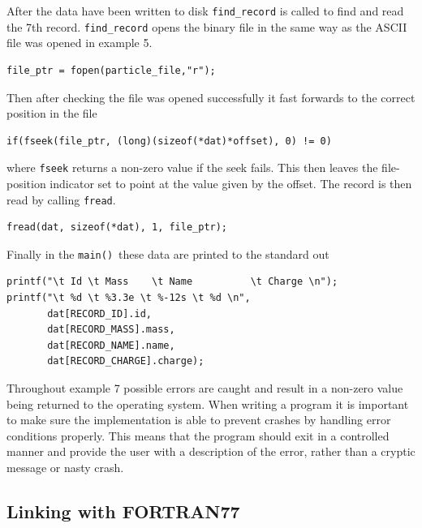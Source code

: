 \documentclass[11pt]{scrartcl}
\def\main{\texttt{main()}}
\begin{document}
After the data have been written to disk \texttt{find\_record} is
called to find and read the 7th record.  \texttt{find\_record} opens
the binary file in the same way as the ASCII file was opened in
example 5.
\begin{lstlisting}
file_ptr = fopen(particle_file,"r"); 
\end{lstlisting}
Then after checking the file was opened successfully it fast forwards to the correct position in the file
\begin{lstlisting}
if(fseek(file_ptr, (long)(sizeof(*dat)*offset), 0) != 0)
\end{lstlisting}
where \texttt{fseek} returns a non-zero value if the seek fails.  This then leaves the file-position indicator set to point at the value given by the offset.  The record is then read by calling \texttt{fread}.
\begin{lstlisting}
fread(dat, sizeof(*dat), 1, file_ptr);
\end{lstlisting}
Finally in the \main\ these data are printed to the standard out
\begin{lstlisting}
printf("\t Id \t Mass    \t Name          \t Charge \n");
printf("\t %d \t %3.3e \t %-12s \t %d \n", 
       dat[RECORD_ID].id,
       dat[RECORD_MASS].mass,
       dat[RECORD_NAME].name,
       dat[RECORD_CHARGE].charge);
\end{lstlisting}

Throughout example 7 possible errors are caught and result in a
non-zero value being returned to the operating system.  When writing
a program it is important to make sure the implementation is able to
prevent crashes by handling error conditions properly.  This means
that the program should exit in a controlled manner and provide the
user with a description of the error, rather than a cryptic message or nasty crash.

\subsection{Linking with FORTRAN77}
\end{document}
